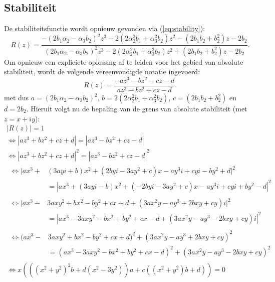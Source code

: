\documentclass[12pt]{article}
\begin{document}
\subsection{Stabiliteit}
De stabiliteitsfunctie wordt opnieuw gevonden via (\ref{eq:stability}):
\begin{equation}
    R(z)=\frac{-(2b_1\alpha_2-\alpha_3b_2)^2z^3-2(2\alpha_2^2b_1+\alpha_3^2b_2)z^2-(2b_1b_2+b_2^2)z-2b_2}{(2b_1\alpha_2-\alpha_3b_2)^2z^3-2(2\alpha_2^2b_1+\alpha_3^2b_2)z^2+(2b_1b_2+b_2^2)z-2b_2}.
\end{equation}
Om opnieuw een expliciete oplossing af te leiden voor het gebied van absolute stabiliteit, wordt de volgende vereenvoudigde notatie ingevoerd:
\begin{equation}
    R(z)=\frac{-az^3-bz^2-cz-d}{az^3-bz^2+cz-d}.
\end{equation}
met dus \(a=(2b_1\alpha_2-\alpha_3b_2)^2\), \(b=2(2\alpha_2^2b_1+\alpha_3^2b_2)\), \(c=(2b_1b_2+b_2^2)\) en \(d=2b_2\). Hieruit volgt nu de bepaling van de grens van absolute stabiliteit (met \(z=x+iy\)):
\begin{gather*}
|R(z)|=1 \\
\Leftrightarrow|az^3 + bz^2 + cz + d| = |az^3 - bz^2 + cz - d| \\
\Leftrightarrow|az^3 + bz^2 + cz + d|^2 = |az^3 - bz^2 + cz - d|^2 \\
\begin{split}
    \Leftrightarrow|ax^3 + &(3ayi + b)x^2 + (2byi - 3ay^2 + c)x - ay^3i + cyi - by^2 + d|^2 \\ &=|ax^3 + (3ayi - b)x^2 + (-2byi - 3ay^2 + c)x - ay^3i + cyi + by^2 - d|^2
\end{split} \\
\begin{split}
    \Leftrightarrow|ax^3 - &3axy^2 + bx^2 - by^2 + cx + d + (3ax^2y - ay^3 + 2bxy + cy)i|^2 \\ &=|ax^3 - 3axy^2 - bx^2 + by^2 + cx - d + (3ax^2y - ay^3 - 2bxy + cy)i|^2
\end{split} \\
\begin{split}
    \Leftrightarrow(ax^3 - &3axy^2 + bx^2 - by^2 + cx + d)^2+(3ax^2y - ay^3 + 2bxy + cy)^2 \\ &=(ax^3 - 3axy^2 - bx^2 + by^2 + cx - d)^2+(3ax^2y - ay^3 - 2bxy + cy)^2
\end{split} \\
\Leftrightarrow x(((x^2 + y^2)^2b + d(x^2 - 3y^2))a + c((x^2 + y^2)b + d))=0
\end{gather*}
\end{document}
